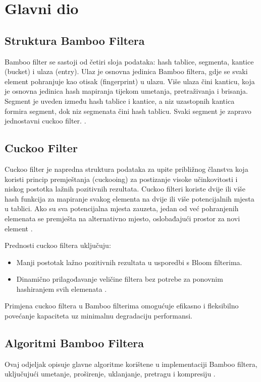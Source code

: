 \documentclass[seminarskirad]{fer}
\begin{document}
	
	\chapter{Glavni dio}
	\label{pog:glavni_dio}
	
	\section{Struktura Bamboo Filtera}
	Bamboo filter se sastoji od četiri sloja podataka: hash tablice, segmenta, kantice (bucket) i ulaza (entry). Ulaz je osnovna jedinica Bamboo filtera, gdje se svaki element pohranjuje kao otisak (fingerprint) u ulazu. Više ulaza čini kanticu, koja je osnovna jedinica hash mapiranja tijekom umetanja, pretraživanja i brisanja. Segment je uveden između hash tablice i kantice, a niz uzastopnih kantica formira segment, dok niz segmenata čini hash tablicu. Svaki segment je zapravo jednostavni cuckoo filter. \cite{wang2022bamboo}.
	
	\section{Cuckoo Filter}
	Cuckoo filter je napredna struktura podataka za upite približnog članstva koja koristi princip premještanja (cuckooing) za postizanje visoke učinkovitosti i niskog postotka lažnih pozitivnih rezultata. Cuckoo filteri koriste dvije ili više hash funkcija za mapiranje svakog elementa na dvije ili više potencijalnih mjesta u tablici. Ako su sva potencijalna mjesta zauzeta, jedan od već pohranjenih elemenata se premješta na alternativno mjesto, oslobađajući prostor za novi element \cite{fan2013cuckoo}.
	
	Prednosti cuckoo filtera uključuju:
	\begin{itemize}
		\item Manji postotak lažno pozitivnih rezultata u usporedbi s Bloom filterima.
		\item Dinamično prilagođavanje veličine filtera bez potrebe za ponovnim hashiranjem svih elemenata \cite{fan2014cuckoo}.
	\end{itemize}
	
	Primjena cuckoo filtera u Bamboo filterima omogućuje efikasno i fleksibilno povećanje kapaciteta uz minimalnu degradaciju performansi.
	
	
	\section{Algoritmi Bamboo Filtera}
	Ovaj odjeljak opisuje glavne algoritme korištene u implementaciji Bamboo filtera, uključujući umetanje, proširenje, uklanjanje, pretragu i kompresiju \cite{wang2022bamboo}.
	
\end{document}

